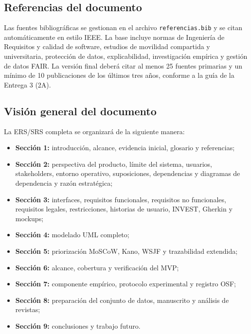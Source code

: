 \documentclass[12pt,a4paper]{article}
\begin{document}
\subsection{Referencias del documento}

Las fuentes bibliográficas se gestionan en el archivo \texttt{referencias.bib} y se citan automáticamente en estilo IEEE. La base incluye normas de Ingeniería de Requisitos y calidad de software, estudios de movilidad compartida y universitaria, protección de datos, explicabilidad, investigación empírica y gestión de datos FAIR. La versión final deberá citar al menos 25 fuentes primarias y un mínimo de 10 publicaciones de los últimos tres años, conforme a la guía de la Entrega 3 (2A).

\subsection{Visión general del documento}

La ERS/SRS completa se organizará de la siguiente manera:

\begin{itemize}
  \item \textbf{Sección 1:} introducción, alcance, evidencia inicial, glosario y referencias;
  \item \textbf{Sección 2:} perspectiva del producto, límite del sistema, usuarios, stakeholders, entorno operativo, suposiciones, dependencias y diagramas de dependencia y razón estratégica;
  \item \textbf{Sección 3:} interfaces, requisitos funcionales, requisitos no funcionales, requisitos legales, restricciones, historias de usuario, INVEST, Gherkin y mockups;
  \item \textbf{Sección 4:} modelado UML completo;
  \item \textbf{Sección 5:} priorización MoSCoW, Kano, WSJF y trazabilidad extendida;
  \item \textbf{Sección 6:} alcance, cobertura y verificación del MVP;
  \item \textbf{Sección 7:} componente empírico, protocolo experimental y registro OSF;
  \item \textbf{Sección 8:} preparación del conjunto de datos, manuscrito y análisis de revistas;
  \item \textbf{Sección 9:} conclusiones y trabajo futuro.
\end{itemize}

\end{document}
